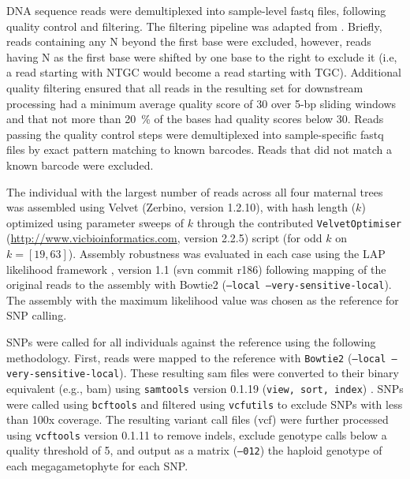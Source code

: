 \documentclass[smallextended]{svjour3}
\begin{document}
DNA sequence reads were demultiplexed into sample-level fastq files, following
quality control and filtering.  The filtering pipeline was adapted from
\citet{Friedline:2012fm}. Briefly, reads containing any N beyond the
first base were excluded, however, reads having N as the first base were shifted
by one base to the right to exclude it (i.e, a read starting with NTGC would
become a read starting with TGC).  Additional quality filtering ensured that all
reads in the resulting set for downstream processing had a minimum average
quality score of 30 over 5-bp sliding windows and that not more than
\SI{20}{\percent} of the bases had quality scores below 30. Reads passing the
quality control steps were demultiplexed into sample-specific fastq files by
exact pattern matching to known barcodes. Reads that did not match a known
barcode were excluded.

The individual with the largest number of reads across all four maternal trees
was assembled using Velvet (Zerbino, version 1.2.10), with hash length ($k$)
optimized using parameter sweeps of $k$ through the contributed
\texttt{VelvetOptimiser} (\url{http://www.vicbioinformatics.com}, version 2.2.5)
script (for odd $k$ on $k=[19,63]$).  Assembly robustness was evaluated in each
case using the LAP likelihood framework \citep{Ghodsi:2013bc}, version 1.1 (svn
commit r186) following mapping of the original reads to the assembly with
Bowtie2 \citep{Langmead:2012jh} (\texttt{--local --very-sensitive-local}).  The
assembly with the maximum likelihood value was chosen as the reference for SNP
calling.

SNPs were called for all individuals against the reference using the following
methodology.  First, reads were mapped to the reference with \texttt{Bowtie2}
(\texttt{--local --very-sensitive-local}).  These resulting sam files were
converted to their binary equivalent (e.g., bam) using \texttt{samtools} version
0.1.19 (\texttt{view, sort, index}) \citep{Li:2009ka}.  SNPs were called using
\texttt{bcftools} and filtered using \texttt{vcfutils} to exclude SNPs with less
than 100x coverage. The resulting variant call files (vcf) were further
processed using \texttt{vcftools} version 0.1.11 \citep{Danecek:2011gz} to
remove indels, exclude genotype calls below a quality threshold of 5, and output
as a matrix (\texttt{--012}) the haploid genotype of each megagametophyte for
each SNP.
\end{document}
